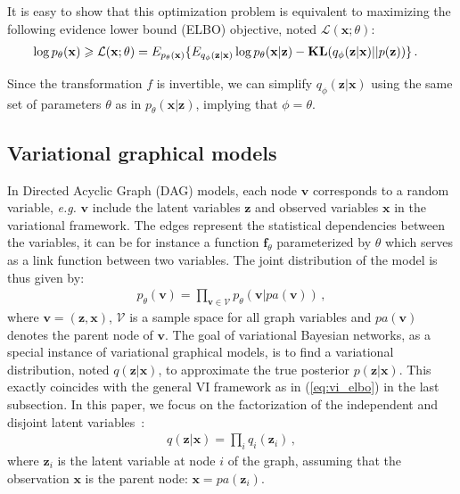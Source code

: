 \documentclass{article} %
\newcommand{\belhal}[1]{{\color{red}{\bf\sf [BK: #1]}}}
\begin{document}
It is easy to show that this optimization problem is equivalent to maximizing the following evidence lower bound (ELBO) objective, noted $\mathcal{L}(\mathbf{x}; \theta)$: 
\begin{align}\label{eq:vi_elbo}
    \log p_\theta(\mathbf{x}) \geqslant \mathcal{L}(\mathbf{x}; \theta) &= E_{p_\theta(\mathbf{x})} 
     \{E_{q_\phi(\mathbf{z}|\mathbf{x})} \log p_\theta(\mathbf{x}|\mathbf{z})  - \textbf{\text{KL}}(q_\phi(\mathbf{z}|\mathbf{x})||p(\mathbf{z}))\} \, .
\end{align}

\belhal{I do not understand the sentence below}

Since the transformation $f$ is invertible, we can simplify $q_\phi(\mathbf{z}|\mathbf{x})$ using the same set of parameters $\theta$ as in $p_\theta(\mathbf{x}|\mathbf{z})$, implying that $\phi=\theta$.

\subsection{Variational graphical models}
In Directed Acyclic Graph (DAG) models, each node $\mathbf{v}$ corresponds to a random variable, \textit{e.g.} $\mathbf{v}$ include the latent variables $\mathbf{z}$ and observed variables $\mathbf{x}$ in the variational framework. 
The edges represent the statistical dependencies between the variables, it can be for instance a function $\mathbf{f}_\theta$ parameterized by $\theta$ which serves as a link function between two variables.  
The joint distribution of the model is thus given by:
\begin{align}
    p_\theta(\mathbf{v}) = \prod_{\mathbf{v} \in \mathcal{V}} p_\theta(\mathbf{v}|pa(\mathbf{v})) \, , 
\end{align}
where $\mathbf{v}=(\mathbf{z}, \mathbf{x})$, $\mathcal{V}$ is a sample space for all graph variables and $pa(\mathbf{v})$ denotes the parent node of $\mathbf{v}$. 
The goal of variational Bayesian networks, as a special instance of variational graphical models, is to find a variational distribution, noted $q(\mathbf{z}|\mathbf{x})$, to approximate the true posterior $p(\mathbf{z}|\mathbf{x})$. 
This exactly coincides with the general VI framework as in (\ref{eq:vi_elbo}) in the last subsection. 
In this paper, we focus on the factorization of the independent and disjoint latent variables~\citep{bishop2003vibes}:
\begin{align}
    q(\mathbf{z}|\mathbf{x}) = \prod_i q_i(\mathbf{z}_i)\, ,
\end{align}
where $\mathbf{z}_i$ is the latent variable at node $i$ of the graph, assuming that the observation $\mathbf{x}$ is the parent node: $\mathbf{x}=pa(\mathbf{z}_i)$. 
\end{document}
